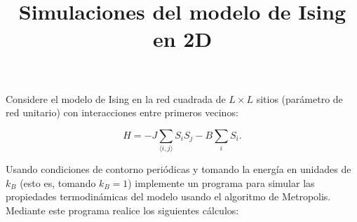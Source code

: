 \documentclass[10pt]{article}
\begin{document}
\title{Simulaciones del modelo de Ising en 2D}

\maketitle


Considere el modelo de Ising en la red cuadrada de $L \times L$ sitios (parámetro de red unitario) con interacciones entre primeros vecinos:

\begin{equation}
H = - J \sum_{\langle i,j\rangle} S_i S_j - B \sum_i S_i.
\end{equation}

Usando condiciones de contorno periódicas y tomando la energía en unidades de $k_B$ (esto es, tomando $k_B = 1$) implemente un programa para simular las propiedades termodinámicas del modelo usando el algoritmo de Metropolis. Mediante este programa realice los siguientes cálculos:


\pagebreak
\end{document}

